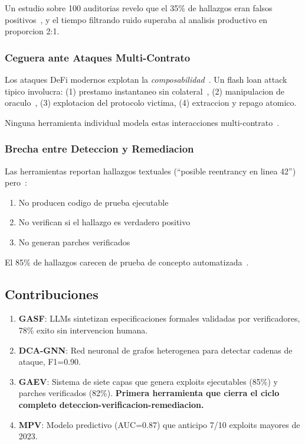 \documentclass[11pt]{article}
\theoremstyle{definition}
\theoremstyle{plain}
\theoremstyle{remark}
\begin{document}
Un estudio sobre 100 auditorias revelo que el 35\% de hallazgos eran falsos positivos~\cite{durieux2020empirical}, y el tiempo filtrando ruido superaba al analisis productivo en proporcion 2:1.

\subsubsection{Ceguera ante Ataques Multi-Contrato}

Los ataques DeFi modernos explotan la \textit{composabilidad}~\cite{zhou2023sok}. Un flash loan attack tipico involucra: (1) prestamo instantaneo sin colateral~\cite{qin2021attacking}, (2) manipulacion de oraculo~\cite{eskandari2021sok}, (3) explotacion del protocolo victima, (4) extraccion y repago atomico.

Ninguna herramienta individual modela estas interacciones multi-contrato~\cite{chen2020survey}.

\subsubsection{Brecha entre Deteccion y Remediacion}

Las herramientas reportan hallazgos textuales (``posible reentrancy en linea 42'') pero~\cite{zhang2023demystifying}:
\begin{enumerate}
    \item No producen codigo de prueba ejecutable
    \item No verifican si el hallazgo es verdadero positivo
    \item No generan parches verificados
\end{enumerate}

El 85\% de hallazgos carecen de prueba de concepto automatizada~\cite{chen2021defiranger}.

\subsection{Contribuciones}

\begin{enumerate}[label=\textbf{C\arabic*:}]
    \item \textbf{GASF}: LLMs sintetizan especificaciones formales validadas por verificadores, 78\% exito sin intervencion humana.
    
    \item \textbf{DCA-GNN}: Red neuronal de grafos heterogenea para detectar cadenas de ataque, F1=0.90.
    
    \item \textbf{GAEV}: Sistema de siete capas que genera exploits ejecutables (85\%) y parches verificados (82\%). \textbf{Primera herramienta que cierra el ciclo completo deteccion-verificacion-remediacion.}
    
    \item \textbf{MPV}: Modelo predictivo (AUC=0.87) que anticipo 7/10 exploits mayores de 2023.
\end{enumerate}
\end{document}

